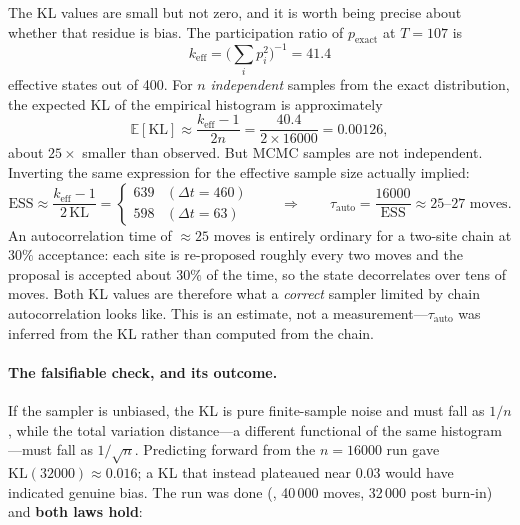 \documentclass[11pt,a4paper]{article}
\newcommand{\dt}{\Delta t}
\begin{document}
The KL values are small but not zero, and it is worth being precise about
whether that residue is bias. The participation ratio of
$p_{\mathrm{exact}}$ at $T=107$ is
\begin{equation}
  k_{\mathrm{eff}} = \Big(\textstyle\sum_{i} p_{i}^{2}\Big)^{-1} = 41.4
\end{equation}
effective states out of 400. For $n$ \emph{independent} samples from the exact
distribution, the expected KL of the empirical histogram is approximately
\begin{equation}
  \mathbb{E}\!\left[\mathrm{KL}\right] \approx \frac{k_{\mathrm{eff}}-1}{2n}
  = \frac{40.4}{2 \times 16000} = 0.00126,
\end{equation}
about $25\times$ smaller than observed. But MCMC samples are not
independent. Inverting the same expression for the effective sample size
actually implied:
\begin{equation}
  \mathrm{ESS} \approx \frac{k_{\mathrm{eff}}-1}{2\,\mathrm{KL}}
  = \begin{cases}
      639 & (\dt=460)\\
      598 & (\dt=63)
    \end{cases}
  \qquad\Longrightarrow\qquad
  \tau_{\mathrm{auto}} = \frac{16000}{\mathrm{ESS}} \approx 25\text{--}27 \text{ moves}.
\end{equation}
An autocorrelation time of $\approx\!25$ moves is entirely ordinary for a
two-site chain at $30\%$ acceptance: each site is re-proposed roughly every
two moves and the proposal is accepted about $30\%$ of the time, so the state
decorrelates over tens of moves. Both KL values are therefore what a
\emph{correct} sampler limited by chain autocorrelation looks like. This is an
estimate, not a measurement---$\tau_{\mathrm{auto}}$ was inferred from the KL
rather than computed from the chain.

\paragraph{The falsifiable check, and its outcome.} If the sampler is
unbiased, the KL is pure finite-sample noise and must fall as $1/n$, while the
total variation distance---a different functional of the same histogram---must
fall as $1/\sqrt{n}$. Predicting forward from the $n=16000$ run gave
$\mathrm{KL}(32000) \approx 0.016$; a KL that instead plateaued near $0.03$
would have indicated genuine bias. The run was done
(, 40\,000
moves, 32\,000 post burn-in) and \textbf{both laws hold}:
\end{document}
